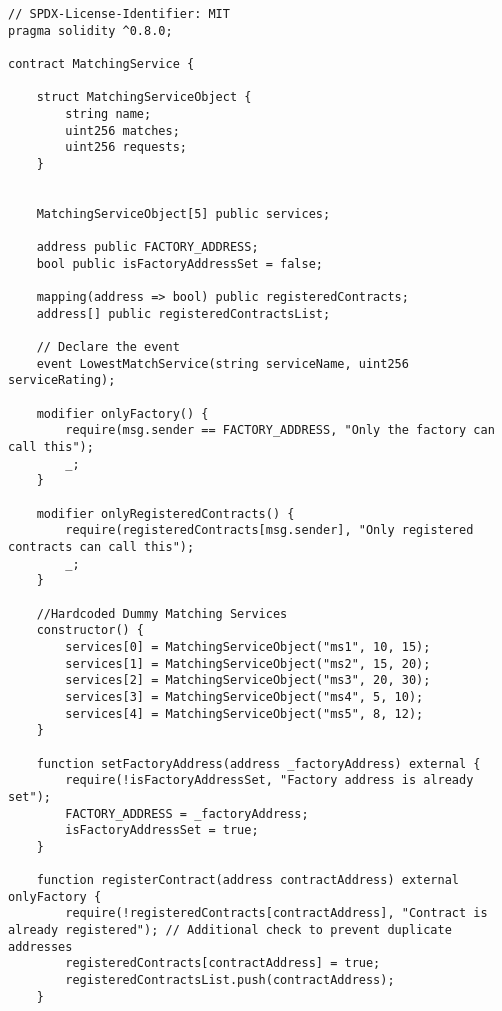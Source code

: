 



\lstset{
  basicstyle=\footnotesize\ttfamily,
  breaklines=true,
  numbers=left,
  firstnumber=1,
}


\begin{lstlisting}
// SPDX-License-Identifier: MIT
pragma solidity ^0.8.0;

contract MatchingService {

    struct MatchingServiceObject {
        string name;
        uint256 matches;
        uint256 requests;
    }


    MatchingServiceObject[5] public services;

    address public FACTORY_ADDRESS;
    bool public isFactoryAddressSet = false;

    mapping(address => bool) public registeredContracts;
    address[] public registeredContractsList; 

    // Declare the event
    event LowestMatchService(string serviceName, uint256 serviceRating);

    modifier onlyFactory() {
        require(msg.sender == FACTORY_ADDRESS, "Only the factory can call this");
        _;
    }

    modifier onlyRegisteredContracts() {
        require(registeredContracts[msg.sender], "Only registered contracts can call this");
        _;
    }

    //Hardcoded Dummy Matching Services 
    constructor() {
        services[0] = MatchingServiceObject("ms1", 10, 15);
        services[1] = MatchingServiceObject("ms2", 15, 20);
        services[2] = MatchingServiceObject("ms3", 20, 30);
        services[3] = MatchingServiceObject("ms4", 5, 10);
        services[4] = MatchingServiceObject("ms5", 8, 12);
    }

    function setFactoryAddress(address _factoryAddress) external {
        require(!isFactoryAddressSet, "Factory address is already set");
        FACTORY_ADDRESS = _factoryAddress;
        isFactoryAddressSet = true;
    }

    function registerContract(address contractAddress) external onlyFactory {
        require(!registeredContracts[contractAddress], "Contract is already registered"); // Additional check to prevent duplicate addresses
        registeredContracts[contractAddress] = true;
        registeredContractsList.push(contractAddress); 
    }


\end{lstlisting}
